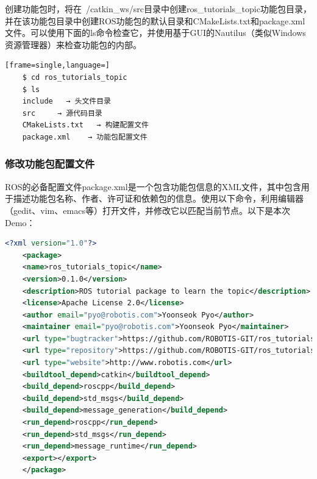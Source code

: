 \documentclass[geye,green,kindle,cn]{elegantnote}
\begin{document}
创建功能包时，将在~/catkin\_ws/src目录中创建ros\_tutorials\_topic功能包目录，并在该功能包目录中创建ROS功能包的默认目录和CMakeLists.txt和package.xml文件。可以使用下面的ls命令检查它，并使用基于GUI的Nautilus（类似Windows资源管理器）来检查功能包的内部。 
\begin{lstlisting}[frame=single,language=]
    $ cd ros_tutorials_topic 
    $ ls 
    include   → 头文件目录 
    src     → 源代码目录 
    CMakeLists.txt   → 构建配置文件 
    package.xml    → 功能包配置文件 
\end{lstlisting}
\subsubsection{修改功能包配置文件}
ROS的必备配置文件package.xml是一个包含功能包信息的XML文件，其中包含用于描述功能包名称、作者、许可证和依赖包的信息。使用以下命令，利用编辑器（gedit、vim、emacs等）打开文件，并修改它以匹配当前节点。以下是本次Demo：
\begin{lstlisting}[frame=single,language=xml]
    <?xml version="1.0"?> 
    <package>  
    <name>ros_tutorials_topic</name>  
    <version>0.1.0</version>  
    <description>ROS tutorial package to learn the topic</description>  
    <license>Apache License 2.0</license>  
    <author email="pyo@robotis.com">Yoonseok Pyo</author>  
    <maintainer email="pyo@robotis.com">Yoonseok Pyo</maintainer>  
    <url type="bugtracker">https://github.com/ROBOTIS-GIT/ros_tutorials/issues</url>  
    <url type="repository">https://github.com/ROBOTIS-GIT/ros_tutorials.git</url>  
    <url type="website">http://www.robotis.com</url>  
    <buildtool_depend>catkin</buildtool_depend>  
    <build_depend>roscpp</build_depend>  
    <build_depend>std_msgs</build_depend>  
    <build_depend>message_generation</build_depend>  
    <run_depend>roscpp</run_depend>  
    <run_depend>std_msgs</run_depend>  
    <run_depend>message_runtime</run_depend>  
    <export></export> 
    </package>
\end{lstlisting}
\end{document}
